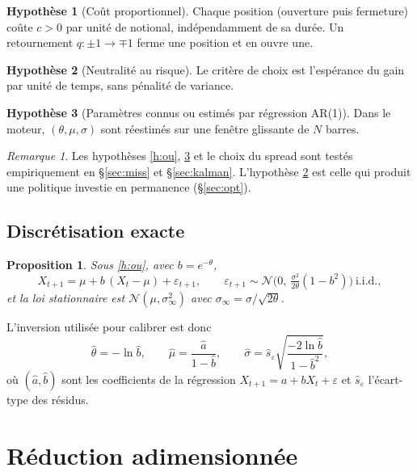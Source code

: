 \documentclass[11pt,a4paper]{article}
\newtheorem{proposition}{Proposition}
\theoremstyle{definition}
\newtheorem{hyp}{Hypothèse}
\theoremstyle{remark}
\newtheorem{remarque}{Remarque}
\newcommand{\sinf}{\sigma_\infty}
\begin{document}
\begin{hyp}[Coût proportionnel]\label{h:cost}
Chaque position (ouverture puis fermeture) coûte $c>0$ par unité de notional, indépendamment de sa durée.
Un retournement $q:\pm1\to\mp1$ ferme une position et en ouvre une.
\end{hyp}

\begin{hyp}[Neutralité au risque]\label{h:rn}
Le critère de choix est l'espérance du gain par unité de temps, sans pénalité de variance.
\end{hyp}

\begin{hyp}[Paramètres connus ou estimés par régression AR(1)]\label{h:est}
Dans le moteur, $(\theta,\mu,\sigma)$ sont réestimés sur une fenêtre glissante de $N$ barres.
\end{hyp}

\begin{remarque}
Les hypothèses \ref{h:ou}, \ref{h:est} et le choix du spread sont testés empiriquement en \S\ref{sec:miss} et
\S\ref{sec:kalman}. L'hypothèse \ref{h:rn} est celle qui produit une politique investie en permanence (\S\ref{sec:opt}).
\end{remarque}

\subsection{Discrétisation exacte}

\begin{proposition}\label{p:ar1}
Sous \ref{h:ou}, avec $b=e^{-\theta}$,
\[
X_{t+1}=\mu+b\,(X_t-\mu)+\varepsilon_{t+1},\qquad
\varepsilon_{t+1}\sim\mathcal N\!\Big(0,\ \tfrac{\sigma^2}{2\theta}(1-b^2)\Big)\ \text{i.i.d.},
\]
et la loi stationnaire est $\mathcal N(\mu,\sinf^2)$ avec $\sinf=\sigma/\sqrt{2\theta}$.
\end{proposition}

L'inversion utilisée pour calibrer est donc
\begin{equation}\label{eq:inversion}
\hat\theta=-\ln\hat b,\qquad \hat\mu=\frac{\hat a}{1-\hat b},\qquad
\hat\sigma=\hat s_\varepsilon\sqrt{\frac{-2\ln\hat b}{1-\hat b^2}},
\end{equation}
où $(\hat a,\hat b)$ sont les coefficients de la régression $X_{t+1}=a+bX_t+\varepsilon$ et $\hat s_\varepsilon$
l'écart-type des résidus.

\section{Réduction adimensionnée}
\end{document}
